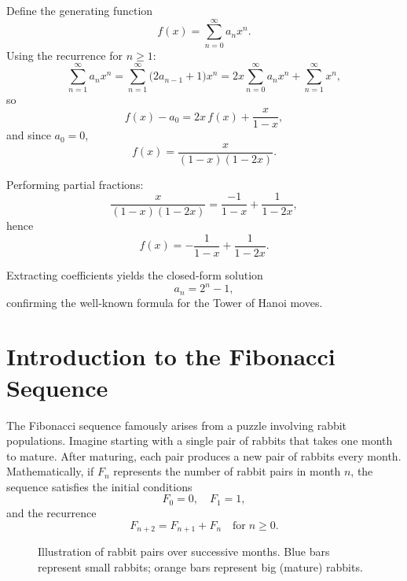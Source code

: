 \documentclass{article}
\begin{document}
Define the generating function
\[
f(x) = \sum_{n=0}^\infty a_n x^n.
\]
Using the recurrence for \(n\ge1\):
\[
\sum_{n=1}^\infty a_n x^n 
= \sum_{n=1}^\infty \bigl(2a_{n-1}+1\bigr)x^n
= 2x\sum_{n=0}^\infty a_n x^n + \sum_{n=1}^\infty x^n,
\]
so
\[
f(x) - a_0 = 2x\,f(x) + \frac{x}{1-x},
\]
and since \(a_0=0\),
\[
f(x) = \frac{x}{(1-x)(1-2x)}.
\]

Performing partial fractions:
\[
\frac{x}{(1-x)(1-2x)}
= \frac{-1}{1-x} + \frac{1}{1-2x},
\]
hence
\[
f(x) = -\frac{1}{1-x} + \frac{1}{1-2x}.
\]

Extracting coefficients yields the closed‑form solution
\[
a_n = 2^n - 1,
\]
confirming the well‑known formula for the Tower of Hanoi moves.
\FloatBarrier

\section{Introduction to the Fibonacci Sequence}
The Fibonacci sequence famously arises from a puzzle involving rabbit populations.
Imagine starting with a single pair of rabbits that takes one month to mature.
After maturing, each pair produces a new pair of rabbits every month.
Mathematically, if \(F_n\) represents the number of rabbit pairs in month \(n\),
the sequence satisfies the initial conditions
\[
F_0 = 0, \quad F_1 = 1,
\]
and the recurrence
\[
F_{n+2} = F_{n+1} + F_n \quad \text{for} \; n \ge 0.
\]

\begin{figure}[ht]
  \centering
\caption{Illustration of rabbit pairs over successive months. 
Blue bars represent small rabbits; orange bars represent big (mature) rabbits.}
\end{figure}
\end{document}
